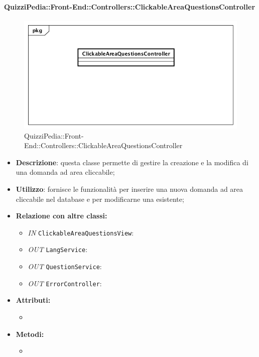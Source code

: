 \paragraph{QuizziPedia::Front-End::Controllers::ClickableAreaQuestionsController}
\begin{figure}
	\centering
	\includegraphics[scale=0.45]{UML/Classi/Front-End/QuizziPedia_Front-end_Controller_ClickableAreaQuestionsController.png}
	\caption{QuizziPedia::Front-End::Controllers::ClickableAreaQuestionsController}
\end{figure}
\begin{itemize}
	\item \textbf{Descrizione}: questa classe permette di gestire la creazione e la modifica di una domanda ad area cliccabile;
	\item \textbf{Utilizzo}: fornisce le funzionalità per inserire una nuova domanda ad area cliccabile nel database e per modificarne una esistente;
	\item \textbf{Relazione con altre classi:}
	\begin{itemize}
		\item \textit{IN} \texttt{ClickableAreaQuestionsView}:  
		\item \textit{OUT} \texttt{LangService}: 
		\item \textit{OUT} \texttt{QuestionService}:
		\item \textit{OUT} \texttt{ErrorController}: 
	\end{itemize}
	\item \textbf{Attributi:}
	\begin{itemize}
		\item 
	\end{itemize}
	\item \textbf{Metodi:}
	\begin{itemize}
		\item 
	\end{itemize}
\end{itemize}

